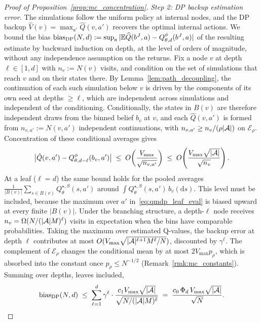 \begin{proof}[Proof of Proposition~\ref{prop:mc_concentration}]
\emph{Step 2: DP backup estimation error.}
The simulations follow the uniform policy at internal nodes, and the DP backup $\hat V(v)=\max_{a'}\hat Q(v,a')$ recovers the optimal internal actions.
We bound the bias $\mathrm{bias}_{\mathrm{DP}}(N,d):=\sup_a|\mathbb{E}\widehat Q(b^J,a)-Q_{\theta,d}^{\phi}(b^J,a)|$ of the resulting estimate by backward induction on depth, at the level of orders of magnitude, without any independence assumption on the returns.
Fix a node $v$ at depth $\ell\in[1,d]$ with $n_v:=N(v)$ visits, and condition on the set of simulations that reach $v$ and on their states there.
By Lemma~\ref{lem:path_decoupling}, the continuation of each such simulation below $v$ is driven by the components of its own seed at depths $\ge\ell$, which are independent across simulations and independent of the conditioning.
Conditionally, the states in $B(v)$ are therefore independent draws from the binned belief $b_v$ at $v$, and each $\hat Q(v,a')$ is formed from $n_{v,a'}:=N(v,a')$ independent continuations, with $n_{v,a'}\ge n_v/(\rho|{\mathcal{A}}|)$ on $\mathcal E_\rho$.
Concentration of these conditional averages gives
\[
\bigl|\hat Q(v,a')-Q_{\theta,d-\ell}^{\phi}(b_v,a')\bigr|
\;\le\;
O\!\left(\frac{V_{\max}}{\sqrt{n_{v,a'}}}\right)
\;\le\;
O\!\left(\frac{V_{\max}\sqrt{|{\mathcal{A}}|}}{\sqrt{n_v}}\right).
\]
At a leaf ($\ell=d$) the same bound holds for the pooled averages $\frac{1}{|B(v)|}\sum_{s\in B(v)}Q_\theta^{\star,S}(s,a')$ around $\int Q_\theta^{\star,S}(s,a')\,b_v(\mathrm ds)$.
This level must be included, because the maximum over $a'$ in~\eqref{eq:qmdp_leaf_eval} is biased upward at every finite $|B(v)|$.
Under the branching structure, a depth-$\ell$ node receives $n_v=\Omega(N/(|{\mathcal{A}}|M)^\ell)$ visits in expectation when the bins have comparable probabilities.
Taking the maximum over estimated Q-values, the backup error at depth $\ell$ contributes at most $O(V_{\max}\sqrt{|{\mathcal{A}}|^{\ell+1}M^\ell/N})$, discounted by $\gamma^\ell$.
The complement of $\mathcal E_\rho$ changes the conditional mean by at most $2V_{\max}p_\rho$, which is absorbed into the constant once $p_\rho\le N^{-1/2}$ (Remark~\ref{rmk:mc_constants}).
Summing over depths, leaves included,
\begin{equation}\label{eq:bias_derivation}
\mathrm{bias}_{\mathrm{DP}}(N,d)
\;\le\;\sum_{\ell=1}^{d}\gamma^\ell\cdot\frac{c_1 V_{\max}\sqrt{|{\mathcal{A}}|}}{\sqrt{N/(|{\mathcal{A}}|M)^\ell}}
\;=\;\frac{c_0\,\Phi_d\,V_{\max}\sqrt{|{\mathcal{A}}|}}{\sqrt{N}}.
\end{equation}


\end{proof}
